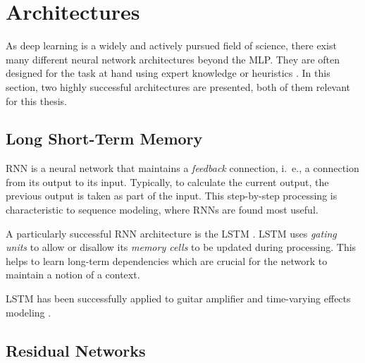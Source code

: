 \section*{Architectures}

As deep learning is a widely and actively pursued field of science, there exist many different neural network architectures beyond the \ac{MLP}. They are often designed for the task at hand using expert knowledge or heuristics \cite{Goodfellow-et-al-2016}. In this section, two highly successful architectures are presented, both of them relevant for this thesis.

\subsection*{Long Short-Term Memory}

\Ac{RNN} is a neural network that maintains a \emph{feedback} connection, i.\ e., a connection from its output to its input. Typically, to calculate the current output, the previous output is taken as part of the input. This step-by-step processing is characteristic to sequence modeling, where \acp{RNN} are found most useful.


A particularly successful \ac{RNN} architecture is the \ac{LSTM} \cite{Hochreiter1997}. \ac{LSTM} uses \emph{gating units} to allow or disallow its \emph{memory cells} to be updated during processing. This helps to learn long-term dependencies which are crucial for the network to maintain a notion of a context.

\ac{LSTM} has been successfully applied to guitar amplifier \cite{Wright2019,Wrightetal2020} and time-varying effects modeling \cite{Wright2020}.

\subsection*{Residual Networks}

